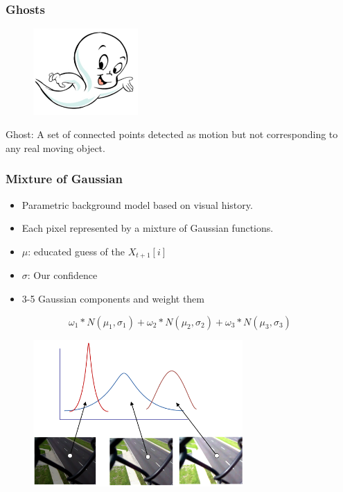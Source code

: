 \documentclass{beamer}
\begin{document}
\begin{frame}
  \frametitle{Ghosts}
 
 \begin{figure}[h]
    \centering
    \includegraphics[width=4cm ]{casper.jpg}
  \end{figure}

Ghost: A set of connected points detected as motion but not corresponding to any real moving object. 
 \end{frame}
\begin{frame}
  \frametitle{Mixture of Gaussian}

  \begin{itemize}
    \item Parametric background model based on visual history.
   \item Each pixel represented by a mixture of Gaussian functions.
   \item $\mu$: educated guess of the $X_{t+1}[i]$
   \item $\sigma$: Our confidence
   \item 3-5 Gaussian components and weight them
   \end{itemize}

   \end{frame}

\begin{frame}

\begin{equation*}
      \omega_1*N(\mu_1, \sigma_1 ) + \omega_2*N(\mu_2, \sigma_2 ) + \omega_3*N(\mu_3, \sigma_3 )
   \end{equation*}

 \begin{figure}[h]
    \centering
    \includegraphics[width=8cm ]{mog.png}
  \end{figure}
\end{frame}
\end{document}

